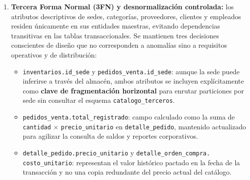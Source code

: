 \documentclass[11pt,oneside]{article}
\begin{document}
\begin{enumerate}[leftmargin=1.5em, itemsep=4pt]
  \item \textbf{Tercera Forma Normal (3FN) y desnormalizaci\'on controlada:}
        los atributos descriptivos de sedes, categor\'ias, proveedores,
        clientes y empleados residen \'unicamente en sus entidades maestras,
        evitando dependencias transitivas en las tablas transaccionales. Se
        mantienen tres decisiones conscientes de dise\~no que no corresponden a
        anomal\'ias sino a requisitos operativos y de distribuci\'on:
        \begin{itemize}[leftmargin=1.3em, itemsep=2pt]
          \item \texttt{inventarios.id\_sede} y \texttt{pedidos\_venta.id\_sede}:
                aunque la sede puede inferirse a trav\'es del almac\'en, ambos
                atributos se incluyen expl\'icitamente como \textbf{clave de
                fragmentaci\'on horizontal} para enrutar particiones por sede
                sin consultar el esquema \texttt{catalogo\_terceros}.
          \item \texttt{pedidos\_\allowbreak venta.\allowbreak total\_\allowbreak registrado}:
                campo calculado como la suma de \texttt{cantidad} $\times$
                \texttt{precio\_\allowbreak unitario} en
                \texttt{detalle\_pedido}, mantenido actualizado para agilizar
                la consulta de saldos y reportes corporativos.
          \item \texttt{detalle\_pedido.\allowbreak precio\_unitario} y
                \texttt{detalle\_\allowbreak orden\_\allowbreak compra.\allowbreak
                costo\_\allowbreak unitario}:
                representan el valor hist\'orico pactado en la fecha de la
                transacci\'on y no una copia redundante del precio actual del
                cat\'alogo.
        \end{itemize}
\end{enumerate}
\end{document}
